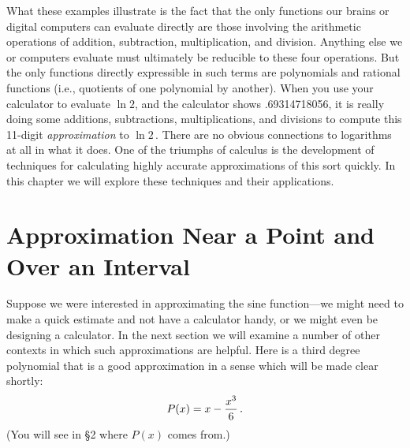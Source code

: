 {{{{        What these examples illustrate is the fact that the only functions our brains or digital computers can evaluate directly are those involving the arithmetic operations of addition, subtraction, 
multiplication, and division. Anything else we or computers evaluate must ultimately be reducible to these four operations.  But the only functions directly expressible in such terms are polynomials and rational functions (i.e., quotients of one polynomial by another).  When you use your calculator to evaluate $\ln 2$, and the calculator shows .69314718056, it is really doing some additions, subtractions, multiplications, and divisions to compute this 11-digit {\em approximation\/} to $\ln 2$\,.  There are no obvious connections to logarithms at all in what it does.  One of the triumphs of calculus is the development of techniques for calculating highly accurate approximations of this sort quickly.  In this chapter we will explore these techniques and their applications.
        
\section{Approximation Near a Point and Over an Interval}

Suppose we were interested in approximating the sine function---we might need to make a quick estimate and not have a calculator handy, or we might even be designing a calculator.  In the next section we will examine a number of other contexts in which such approximations are helpful.  Here is a third degree polynomial that is a good approximation in a sense which will be made clear shortly:
\[
P(x) = x - {x^3 \over 6}\, .
\]
(You will see in \S2 where $P(x)$ comes from.)

}}}}
